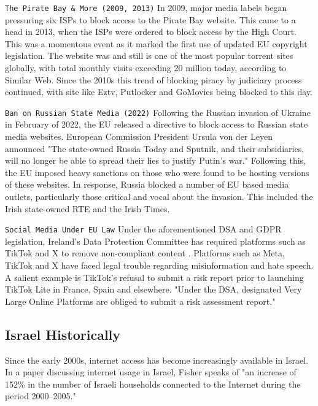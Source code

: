 \texttt{The Pirate Bay \& More (2009, 2013)}
In 2009, major media labels began pressuring six ISPs to block access to the Pirate Bay website. This came to a head in 2013, when the ISPs were ordered to block access by the High Court. \cite{piratebay_block2013} This was a momentous event as it marked the first use of updated EU copyright legislation. The website was and still is one of the most popular torrent sites globally, with total monthly visits exceeding 20 million today, according to Similar Web. \cite{piratebay_stats2025} Since the 2010s this trend of blocking piracy by judiciary process continued, with site like Eztv, Putlocker and GoMovies being blocked to this day.

\texttt{Ban on Russian State Media (2022)}
Following the Russian invasion of Ukraine in February of 2022, the EU released a directive \cite{eu_sanctions_russia_media} to block access to Russian state media websites. European Commission President Ursula von der Leyen announced "The state-owned Russia Today and Sputnik, and their subsidiaries, will no longer be able to spread their lies to justify Putin’s war." \cite{rt_ban2022} Following this, the EU imposed heavy sanctions on those who were found to be hosting versions of these websites. In response, Russia blocked a number of EU based media outlets, particularly those critical and vocal about the invasion. This included the Irish state-owned RTE and the Irish Times. \cite{euronews_russia_media_block2024}

\texttt{Social Media Under EU Law}
Under the aforementioned DSA and GDPR legislation, Ireland's Data Protection Committee has required platforms such as TikTok \cite{dpc2023tiktok} and X \cite{irishtimes2024x} to remove non-compliant content \cite{iapp2023tiktok}. Platforms such as Meta, TikTok and X have faced legal trouble regarding misinformation and hate speech. A salient example is TikTok's refusal to submit a risk report prior to launching TikTok Lite in France, Spain and elsewhere. "Under the DSA, designated Very Large Online Platforms are obliged to submit a risk assessment report." \cite{ec_press_release_2024} 


\subsection{Israel Historically}
Since the early 2000s, internet access has become increasingly available in Israel. In a paper discussing internet usage in Israel, Fisher speaks of "an increase of 152\% in the number of Israeli households connected to the Internet during the period 2000–2005." \cite{FISHER2006984} 

